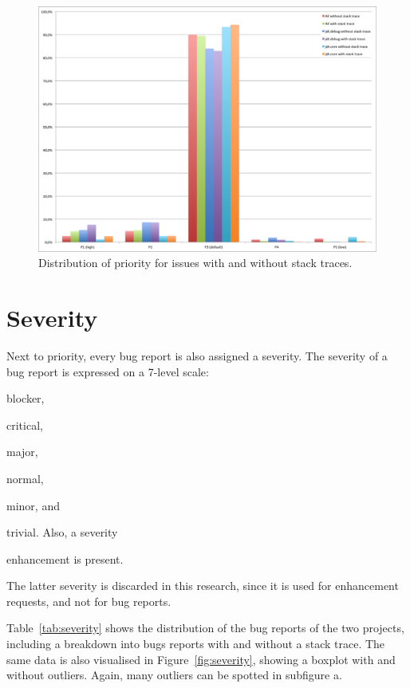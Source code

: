 \begin{figure}[!ht]
	\centering
		\includegraphics[width=1\textwidth]{img/priority.png}
	\caption{Distribution of priority for issues with and without stack traces.}
	\label{fig:priority}
\end{figure}

\section{Severity} %
\label{sec:severity}
Next to priority, every bug report is also assigned a severity. The severity of a bug report is expressed on a 7-level scale: 
\begin{inparaenum}[(1)]
\item blocker,
\item critical,
\item major,
\item normal,
\item minor, and
\item trivial. Also, a severity
\item enhancement is present.
\end{inparaenum}
The latter severity is discarded in this research, since it is used for enhancement requests, and not for bug reports.

Table~\ref{tab:severity} shows the distribution of the bug reports of the two projects, including a breakdown into bugs reports with and without a stack trace. The same data is also visualised in Figure~\ref{fig:severity}, showing a boxplot with and without outliers. Again, many outliers can be spotted in subfigure a.

